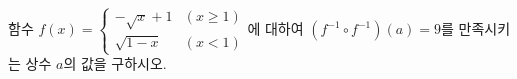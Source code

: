 \hspace*{2mm}\begin{minipage}[t]{\dimexpr\linewidth-2mm\relax}\vspace{0pt}
함수 $f(x)=\begin{cases} -\sqrt{x}+1 & (x\ge 1) \\ \sqrt{1-x} & (x<1) \end{cases}$에 대하여 $(f^{-1}\circ f^{-1})(a)=9$를 만족시키는 상수 $a$의 값을 구하시오.\end{minipage}
